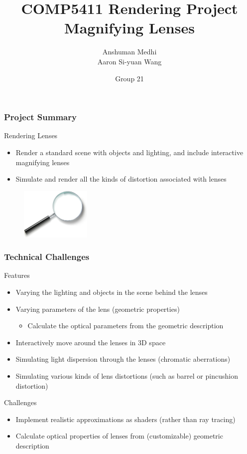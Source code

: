 \documentclass{beamer}
\title[COMP5411 Rendering Project]{COMP5411 Rendering Project \\ Magnifying Lenses}
\author[Anshuman \& Aaron]{Anshuman Medhi \\ Aaron Si-yuan Wang}
\date{Group 21}
\begin{document}
\frame{\titlepage}

\begin{frame}
    \frametitle{Project Summary}
    \begin{block}{Rendering Lenses}
       \begin{itemize}
        \item Render a standard scene with objects and lighting, and include interactive magnifying lenses
        \item Simulate and render all the kinds of distortion associated with lenses
       \end{itemize} 
    \end{block}
\begin{figure}[htpb]
    \centering
        \includegraphics[width=0.3\textwidth]{images/mag}
    \end{figure}
\end{frame}

\begin{frame}
    \frametitle{Technical Challenges}
    \begin{block}{Features}
        \begin{itemize}
        \item Varying the lighting and objects in the scene behind the lenses
        \item Varying parameters of the lens (geometric properties)
        \begin{itemize}
            \item Calculate the optical parameters from the geometric description
        \end{itemize}
        \item Interactively move around the lenses in 3D space
        \item Simulating light dispersion through the lenses (chromatic aberrations)
        \item Simulating various kinds of lens distortions (such as barrel or pincushion distortion)
        \end{itemize}
    \end{block}
    \begin{block}{Challenges}
       \begin{itemize}
           \item Implement realistic approximations as shaders (rather than ray tracing)
           \item Calculate optical properties of lenses from (customizable) geometric description
       \end{itemize} 
    \end{block}
\end{frame} 
\end{document}
